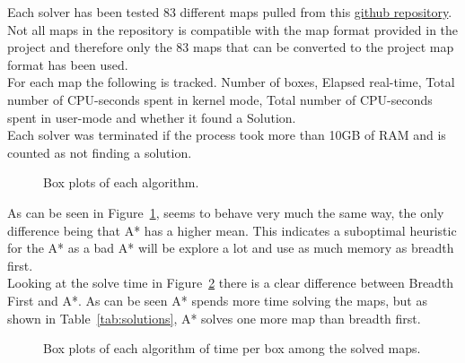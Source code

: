 \documentclass[../../main.tex]{subfiles}
\begin{document}
Each solver has been tested 83 different maps pulled from this
\href{https://github.com/bravegnu/python-sokoban}{github repository}.
Not all maps in the repository is compatible with the map format provided in the project
and therefore only the 83 maps that can be converted to the project map format has been used.\\

For each map the following is tracked. Number of boxes, Elapsed real-time,
Total number of CPU-seconds spent in kernel mode, Total number of CPU-seconds spent in user-mode and whether it found a Solution.\\

Each solver was terminated if the process took more than 10GB of RAM and is counted as not finding a solution.

\newpage

\begin{figure}[h]
	\centering
	\caption{Box plots of each algorithm.}%
	\label{fig:boxplots}
\end{figure}

As can be seen in Figure~\ref{fig:boxplots}, seems to behave very much the same way, the only
difference being that A* has a higher mean. This indicates a suboptimal heuristic for the A*
as a bad A* will be explore a lot and use as much memory as breadth first.\\

Looking at the solve time in Figure~\ref{fig:boxplots_time} there is a clear difference between
Breadth First and A*. As can be seen A* spends more time solving the maps, but as shown in
Table~\ref{tab:solutions}, A* solves one more map than breadth first.\\

\begin{figure}[h]
	\centering

	\caption{Box plots of each algorithm of time per box among the solved maps.}%
	\label{fig:boxplots_time}
\end{figure}
\end{document}
